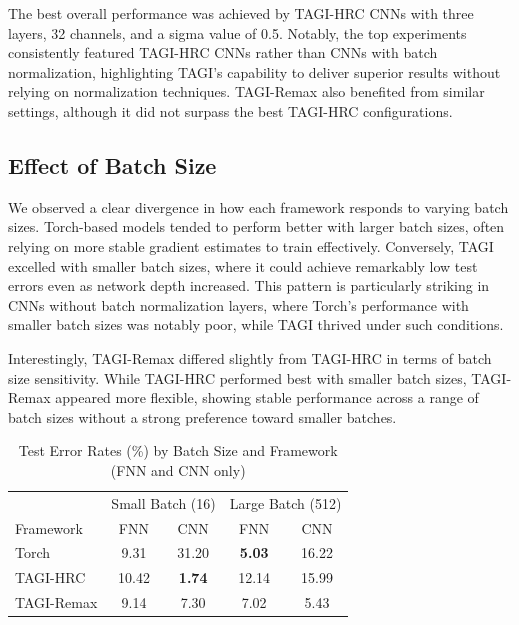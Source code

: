 \documentclass{article}
\begin{document}
The best overall performance was achieved by TAGI-HRC CNNs with three layers, 32 channels, and a sigma value of 0.5. Notably, the top experiments consistently featured TAGI-HRC CNNs rather than CNNs with batch normalization, highlighting TAGI's capability to deliver superior results without relying on normalization techniques. TAGI-Remax also benefited from similar settings, although it did not surpass the best TAGI-HRC configurations.

\subsection{Effect of Batch Size}
We observed a clear divergence in how each framework responds to varying batch sizes. Torch-based models tended to perform better with larger batch sizes, often relying on more stable gradient estimates to train effectively. Conversely, TAGI excelled with smaller batch sizes, where it could achieve remarkably low test errors even as network depth increased. This pattern is particularly striking in CNNs without batch normalization layers, where Torch's performance with smaller batch sizes was notably poor, while TAGI thrived under such conditions.

Interestingly, TAGI-Remax differed slightly from TAGI-HRC in terms of batch size sensitivity. While TAGI-HRC performed best with smaller batch sizes, TAGI-Remax appeared more flexible, showing stable performance across a range of batch sizes without a strong preference toward smaller batches.

\begin{table}[h]
\centering
\caption{Test Error Rates (\%) by Batch Size and Framework (FNN and CNN only)}
\label{tab:batch_size_impact}
\begin{small}
\begin{tabular}{lcccc}
\toprule
 & \multicolumn{2}{c}{Small Batch (16)} & \multicolumn{2}{c}{Large Batch (512)} \\
Framework & FNN & CNN & FNN & CNN \\
\midrule
Torch      &  9.31 & 31.20 &  \textbf{5.03} & 16.22 \\
TAGI-HRC   & 10.42 & \textbf{1.74} & 12.14 & 15.99 \\
TAGI-Remax &  9.14 &  7.30 &  7.02 &  5.43 \\
\bottomrule
\end{tabular}
\end{small}
\end{table}
\end{document}
